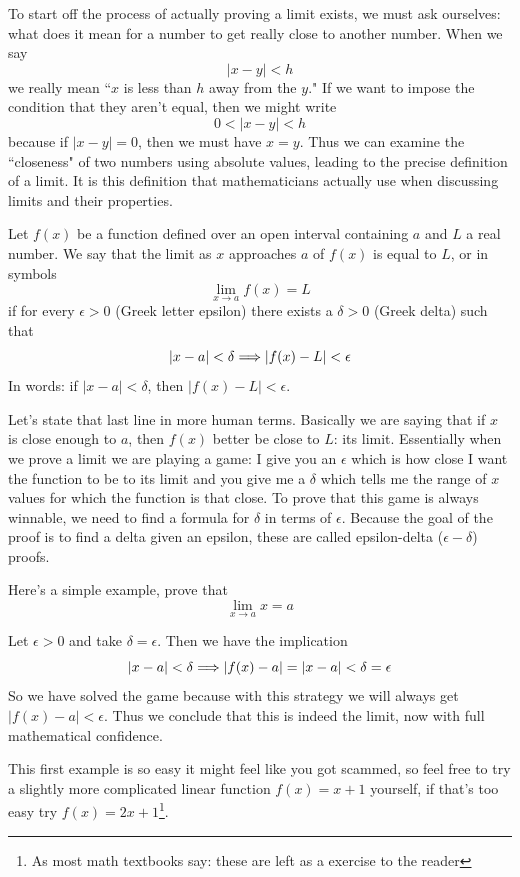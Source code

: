 To start off the process of actually proving a limit exists, we must ask ourselves: what does it mean for a number to get really close to another number. When we say
\[ |x - y| < h \]
we really mean ``$x$ is less than $h$ away from the $y$." If we want to impose the condition that they aren't equal, then we might write
\[ 0 < |x - y| < h \]
because if $|x - y| = 0$, then we must have $x = y$. Thus we can examine the ``closeness" of two numbers using absolute values, leading to the precise definition of a limit. It is this definition that mathematicians actually use when discussing limits and their properties.

\begin{definition}
	Let $f(x)$ be a function defined over an open interval containing $a$ and $L$ a real number. We say that the limit as $x$ approaches $a$ of $f(x)$ is equal to $L$, or in symbols
	\[ \lim_{x \to a} f(x) = L \]
	if for every $\epsilon > 0$ (Greek letter epsilon) there exists a $\delta > 0$ (Greek delta) such that
	\[ |x - a| < \delta \Longrightarrow |f(x) - L| < \epsilon \]
	In words: if $|x - a| < \delta$, then $|f(x) - L| < \epsilon$.
\end{definition}

Let's state that last line in more human terms. Basically we are saying that if $x$ is close enough to $a$, then $f(x)$ better be close to $L$: its limit. Essentially when we prove a limit we are playing a game: I give you an $\epsilon$ which is how close I want the function to be to its limit and you give me a $\delta$ which tells me the range of $x$ values for which the function is that close. To prove that this game is always winnable, we need to find a formula for $\delta$ in terms of $\epsilon$. Because the goal of the proof is to find a delta given an epsilon, these are called epsilon-delta ($\epsilon-\delta$) proofs.

\begin{example}
	Here's a simple example, prove that
	\[ \lim_{x \to a} x = a \]
	
	Let $\epsilon > 0$ and take $\delta = \epsilon$. Then we have the implication
	\[ |x - a| < \delta \Longrightarrow |f(x) - a| = |x - a| < \delta = \epsilon \]
	So we have solved the game because with this strategy we will always get $|f(x) - a| < \epsilon$. Thus we conclude that this is indeed the limit, now with full mathematical confidence.
\end{example}

This first example is so easy it might feel like you got scammed, so feel free to try a slightly more complicated linear function $f(x) = x + 1$ yourself, if that's too easy try $f(x) = 2x + 1$\footnote{As most math textbooks say: these are left as a exercise to the reader}.

